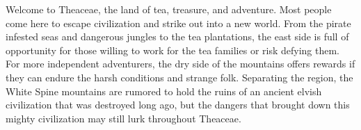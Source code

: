 Welcome to Theaceae, the land of tea, treasure, and adventure.
Most people come here to escape civilization and strike out into a new world.
From the pirate infested seas and dangerous jungles to the tea plantations, the east side is full of opportunity for those willing to work for the tea families or risk defying them.
For more independent adventurers, the dry side of the mountains offers rewards if they can endure the harsh conditions and strange folk.
Separating the region, the White Spine mountains are rumored to hold the ruins of an ancient elvish civilization that was destroyed long ago, but the dangers that brought down this mighty civilization may still lurk throughout Theaceae.
